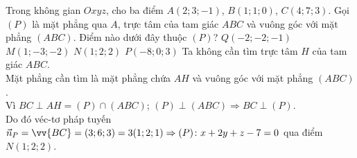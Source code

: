 \begin{ex}%
	Trong không gian $O x y z$, cho ba điểm $A(2;3;-1)$, $B(1;1;0)$, $C(4;7;3)$. Gọi $(P)$ là mặt phẳng qua $A$, trực tâm của tam giác $ABC$ và vuông góc với mặt phẳng $(ABC)$. Điểm nào dưới đây thuộc $(P)$?
	\choice 
	{$Q(-2;-2;-1)$}
	{$M(1;-3;-2)$}
	{$N(1;2;2)$\True}
	{$P(-8;0;3)$}
	\loigiai
	{
Ta không cần tìm trực tâm $H$ của tam giác $ABC$.\\
Mặt phẳng cần tìm là mặt phẳng chứa $AH$ và vuông góc với mặt phẳng $(ABC)$.\\ 
Vì $BC\perp AH=(P)\cap (ABC)$; $(P)\perp(ABC)\Rightarrow BC\perp (P)$.\\
Do đó véc-tơ pháp tuyến $\vec{n}_P=\vv{BC}=(3;6;3)=3 (1;2;1)\Rightarrow (P)\colon x+2y+z-7=0$ qua điểm $N(1;2;2)$.
}
\end{ex}


